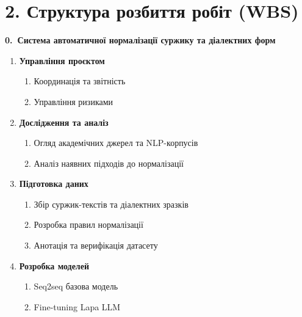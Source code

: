 \documentclass[14pt]{extarticle}
\begin{document}
\section*{2. Структура розбиття робіт (WBS)}

\noindent\textbf{0.\ Система автоматичної нормалізації суржику та діалектних форм}

\vspace{4pt}
\begin{enumerate}[label=\textbf{\arabic*.}, leftmargin=1.5cm, itemsep=3pt, topsep=4pt, parsep=0pt]
  \item \textbf{Управління проєктом}
  \begin{enumerate}[label=1.\arabic*., leftmargin=1.2cm, itemsep=1pt, topsep=2pt, parsep=0pt, partopsep=0pt]
    \item Координація та звітність
    \item Управління ризиками
  \end{enumerate}

  \item \textbf{Дослідження та аналіз}
  \begin{enumerate}[label=2.\arabic*., leftmargin=1.2cm, itemsep=1pt, topsep=2pt, parsep=0pt, partopsep=0pt]
    \item Огляд академічних джерел та NLP-корпусів
    \item Аналіз наявних підходів до нормалізації
  \end{enumerate}

  \item \textbf{Підготовка даних}
  \begin{enumerate}[label=3.\arabic*., leftmargin=1.2cm, itemsep=1pt, topsep=2pt, parsep=0pt, partopsep=0pt]
    \item Збір суржик-текстів та діалектних зразків
    \item Розробка правил нормалізації
    \item Анотація та верифікація датасету
  \end{enumerate}

  \item \textbf{Розробка моделей}
  \begin{enumerate}[label=4.\arabic*., leftmargin=1.2cm, itemsep=1pt, topsep=2pt, parsep=0pt, partopsep=0pt]
    \item Seq2seq базова модель
    \item Fine-tuning Lapa LLM
  \end{enumerate}


\end{enumerate}
\end{document}

